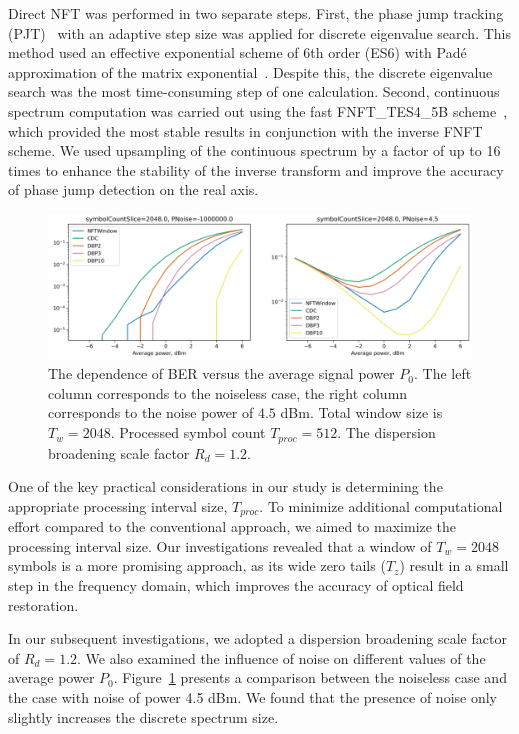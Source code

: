 Direct NFT was performed in two separate steps. First, the phase jump tracking (PJT)~\cite{chekhovskoy2020introducing, 9542265} with an adaptive step size was applied for discrete eigenvalue search. This method used an effective exponential scheme of 6th order (ES6) with Pad\'e approximation of the matrix exponential~\cite{Medvedev2022}. Despite this, the discrete eigenvalue search was the most time-consuming step of one calculation.
%
Second, continuous spectrum computation was carried out using the fast FNFT\_TES4\_5B scheme~\cite{Medvedev2020_OE, Prins2018a}, which provided the most stable results in conjunction with the inverse FNFT scheme.
%
We used upsampling of the continuous spectrum by a factor of up to 16 times to enhance the stability of the inverse transform and improve the accuracy of phase jump detection on the real axis.

\begin{figure}[!hbt]
    \centering
    \includegraphics[width=1.0\linewidth]{images/window/ber_window.PNG}
    \caption{The dependence of BER versus the average signal power $P_0$. The left column corresponds to the noiseless case, the right column corresponds to the noise power of $4.5$ dBm. Total window size is $T_w=2048$. Processed symbol count $T_{proc} = 512$. The dispersion broadening scale factor $R_d=1.2$.}
    \label{fig:noise_all}
\end{figure}

One of the key practical considerations in our study is determining the appropriate processing interval size, $T_{proc}$. To minimize additional computational effort compared to the conventional approach, we aimed to maximize the processing interval size. Our investigations revealed that a window of $T_w=2048$ symbols is a more promising approach, as its wide zero tails ($T_z$) result in a small step in the frequency domain, which improves the accuracy of optical field restoration.

In our subsequent investigations, we adopted a dispersion broadening scale factor of $R_d=1.2$. We also examined the influence of noise on different values of the average power $P_0$. Figure~\ref{fig:noise_all} presents a comparison between the noiseless case and the case with noise of power 4.5 dBm. We found that the presence of noise only slightly increases the discrete spectrum size.

